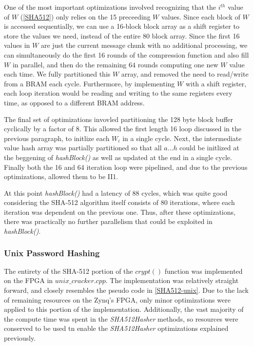 One of the most important optimizations
involved recognizing that the $i^{th}$ value of $W$ (\ref{SHA512}) only relies on the 15 preceeding $W$ values.
Since each block of $W$ is accessed sequentially, we can use a 16-block block array as a shift register
to store the values we need, instead of the entire 80 block array. Since the first 16 values in $W$ are
just the current message chunk with no additional processing, we can simultaneously do the first 16
rounds of the compression function and also fill $W$ in parallel, and then do the remaining $64$ rounds
computing one new $W$ value each time. We fully partitioned this $W$ array, and removed the need
to read/write from a BRAM each cycle. Furthermore, by implementing $W$ with a shift register,
each loop iteration would be reading and writing to the same registers every time,
as opposed to a different BRAM address.

The final set of optimizations invovled partitioning the 128 byte block buffer
cyclically by a factor of 8. This allowed the first length 16 loop discussed
in the previous paragraph, to initlize each $W_i$ in a single cycle. Next, the
intermediate value hash array was partially partitioned so that all $a \ldots h$ could
be initlized at the beggening of \emph{hashBlock()} as well as updated
at the end in a single cycle. Finally both the 16 and 64 iteration loop were
pipelined, and due to the previous optimizations, allowed them to be II1.


At this point \emph{hashBlock()} had a latency of 88 cycles, which was quite good
considering the SHA-512 algorithm itself consists of 80 iterations,
where each iteration was dependent on the previous one. Thus, after these optimizations,
there was practically no further parallelism that could be exploited in \emph{hashBlock()}.


\subsubsection{Unix Password Hashing}
The entirety of the SHA-512 portion of the $crypt()$ function was implemented
on the FPGA in $unix\_cracker.cpp$. The implementation was relatively straight
forward, and closely resembles the pseudo code in \ref{SHA512-unix}.
Due to the lack of remaining resources on the Zynq's FPGA, only minor
optimizations were applied to this portion of the implementation.
Additionally, the vast majority of the compute time was spent in the
\emph{SHA512Hasher} methods, so resources were conserved to be used tn enable the
\emph{SHA512Hasher} optimizations explained previously.

